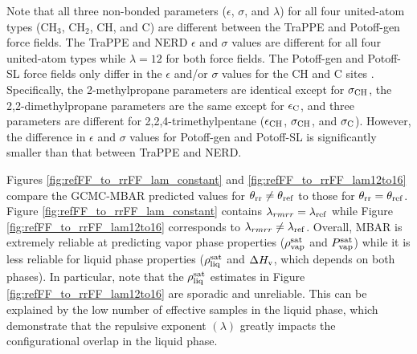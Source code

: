 \documentclass[journal=jced,manuscript=article]{achemso}
\begin{document}
Note that all three non-bonded parameters ($\epsilon$, $\sigma$, and $\lambda$) for all four united-atom types (CH$_3$, CH$_2$, CH, and C) are different between the TraPPE and Potoff-gen force fields. The TraPPE and NERD $\epsilon$ and $\sigma$ values are different for all four united-atom types while $\lambda = 12$ for both force fields. The Potoff-gen and Potoff-SL force fields only differ in the $\epsilon$ and/or $\sigma$ values for the CH and C sites . Specifically, the 2-methylpropane parameters are identical except for $\sigma_{\rm CH}$, the 2,2-dimethylpropane parameters are the same except for $\epsilon_{\rm C}$, and three parameters are different for 2,2,4-trimethylpentane ($\epsilon_{\rm CH}$, $\sigma_{\rm CH}$, and $\sigma_{\rm C}$). However, the difference in $\epsilon$ and $\sigma$ values for Potoff-gen and Potoff-SL is significantly smaller than that between TraPPE and NERD.

Figures \ref{fig:refFF_to_rrFF_lam_constant} and \ref{fig:refFF_to_rrFF_lam12to16} compare the GCMC-MBAR predicted values for $\theta_{\rm rr} \neq \theta_{\rm ref}$ to those for $\theta_{\rm rr} = \theta_{\rm ref}$. Figure \ref{fig:refFF_to_rrFF_lam_constant} contains $\lambda_{rm rr} = \lambda_{\rm ref}$ while Figure \ref{fig:refFF_to_rrFF_lam12to16} corresponds to $\lambda_{rm rr} \neq \lambda_{\rm ref}$. Overall, MBAR is extremely reliable at predicting vapor phase properties ($\rho_{\rm vap}^{\rm sat}$ and $P_{\rm vap}^{\rm sat}$) while it is less reliable for liquid phase properties ($\rho_{\rm liq}^{\rm sat}$ and $\Delta H_{\rm v}$, which depends on both phases). In particular, note that the $\rho_{\rm liq}^{\rm sat}$ estimates in Figure \ref{fig:refFF_to_rrFF_lam12to16} are sporadic and unreliable. This can be explained by the low number of effective samples in the liquid phase, which demonstrate that the repulsive exponent $(\lambda)$ greatly impacts the configurational overlap in the liquid phase.

\end{document}
